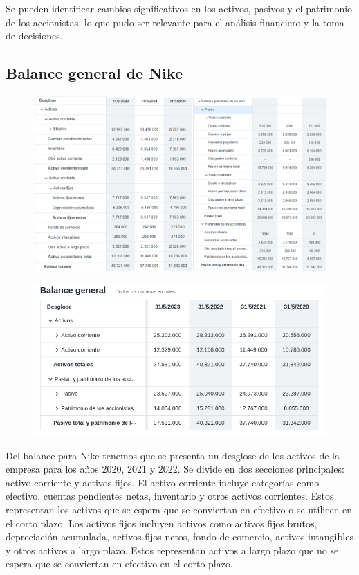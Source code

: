 \documentclass[a4paper,12pt]{article}
\begin{document}
Se pueden identificar cambios significativos en los activos, pasivos y el patrimonio de los accionistas, lo que pudo ser relevante para el análisis financiero y la toma de decisiones.



\clearpage
\subsection{Balance general de Nike}

\begin{figure}[ht!]
	\centering

	\includegraphics[width=.9\textwidth]{NikeB}
\end{figure}

\begin{figure}[ht!]
	\centering

	\includegraphics[width=.9\textwidth]{NikeBA}
\end{figure}

Del balance para Nike tenemos que se presenta un desglose de los activos de la empresa para los años 2020, 2021 y 2022.
Se divide en dos secciones principales: activo corriente y activos fijos.
El activo corriente incluye categorías como efectivo, cuentas pendientes netas, inventario y otros activos corrientes. Estos representan los activos que se espera que se conviertan en efectivo o se utilicen en el corto plazo.
Los activos fijos incluyen activos como activos fijos brutos, depreciación acumulada, activos fijos netos, fondo de comercio, activos intangibles y otros activos a largo plazo. Estos representan activos a largo plazo que no se espera que se conviertan en efectivo en el corto plazo.
\end{document}
